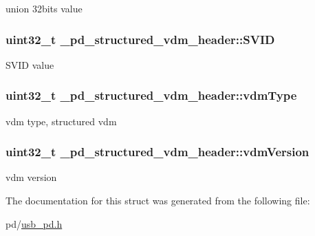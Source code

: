 union 32bits value \hypertarget{struct__pd__structured__vdm__header_a9b7bde8903697b83450597f27aceb370}{
\subsubsection[{S\-V\-I\-D}]{\setlength{\rightskip}{0pt plus 5cm}uint32\-\_\-t \-\_\-pd\-\_\-structured\-\_\-vdm\-\_\-header\-::\-S\-V\-I\-D}}\label{struct__pd__structured__vdm__header_a9b7bde8903697b83450597f27aceb370}
S\-V\-I\-D value \hypertarget{struct__pd__structured__vdm__header_a096921553a1351b55e5419e8f5eac69a}{
\subsubsection[{vdm\-Type}]{\setlength{\rightskip}{0pt plus 5cm}uint32\-\_\-t \-\_\-pd\-\_\-structured\-\_\-vdm\-\_\-header\-::vdm\-Type}}\label{struct__pd__structured__vdm__header_a096921553a1351b55e5419e8f5eac69a}
vdm type, structured vdm \hypertarget{struct__pd__structured__vdm__header_af95df1485673cf3bd9b62d4de0185a07}{
\subsubsection[{vdm\-Version}]{\setlength{\rightskip}{0pt plus 5cm}uint32\-\_\-t \-\_\-pd\-\_\-structured\-\_\-vdm\-\_\-header\-::vdm\-Version}}\label{struct__pd__structured__vdm__header_af95df1485673cf3bd9b62d4de0185a07}
vdm version 

The documentation for this struct was generated from the following file\-:\begin{DoxyCompactItemize}
\item 
pd/\hyperlink{usb__pd_8h}{usb\-\_\-pd.\-h}\end{DoxyCompactItemize}

